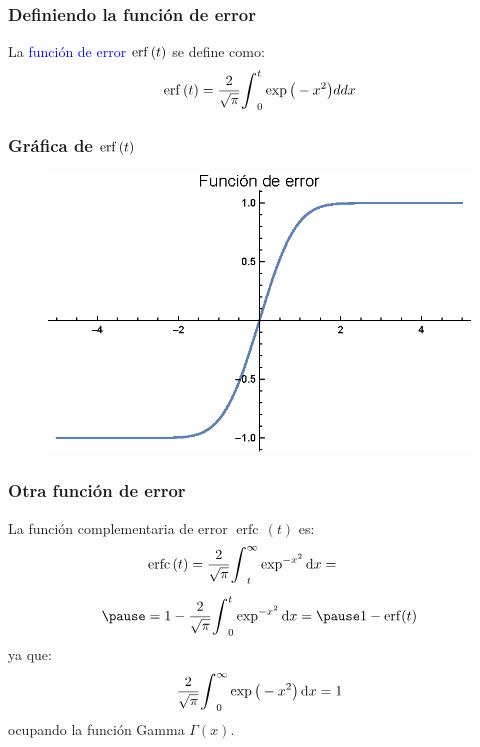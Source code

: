 \documentclass[12pt]{beamer}
\DeclareMathOperator\erfc{erfc}
\begin{document}
\begin{frame}
\frametitle{Definiendo la función de error}
La \textcolor{blue}{función de error} $\erf \, (t)$ se define como:
\pause
\begin{align*}
\erf \, (t) = \dfrac{2}{\sqrt{\pi}} \scaleint{6ex}_{0}^{t} \exp\big(-x^{2} \big) dd{x}
\end{align*}
\end{frame}
\begin{frame}
\frametitle{Gráfica de $\erf \, (t)$}
\begin{figure}
    \centering
    \includegraphics[scale=1]{Imagenes/Plot_Funcion_Error_01.eps}
\end{figure}
\end{frame}
\begin{frame}
\frametitle{Otra función de error}
La función complementaria de error $\erfc \, (t)$ es:
\pause
\begin{eqnarray}
\begin{aligned}[b]
&\erfc \, (t) = \dfrac{2}{\sqrt{\pi}} \scaleint{6ex}_{t}^{\infty} \exp^{-x^{2}} \dd{x} = \\[0.5em] \pause
&= 1 - \dfrac{2}{\sqrt{\pi}} \scaleint{6ex}_{0}^{t} \exp^{-x^{2}} \dd{x} = \pause 1 - \erf (t)
\end{aligned}
\label{eq:ecuacion_03_38}
\end{eqnarray}
ya que:
\begin{align*}
\dfrac{2}{\sqrt{\pi}} \scaleint{6ex}_{0}^{\infty} \exp\big(-x^{2} \big) \dd{x} = 1
\end{align*}
ocupando la función Gamma $\Gamma (x)$.
\end{frame}
\end{document}

